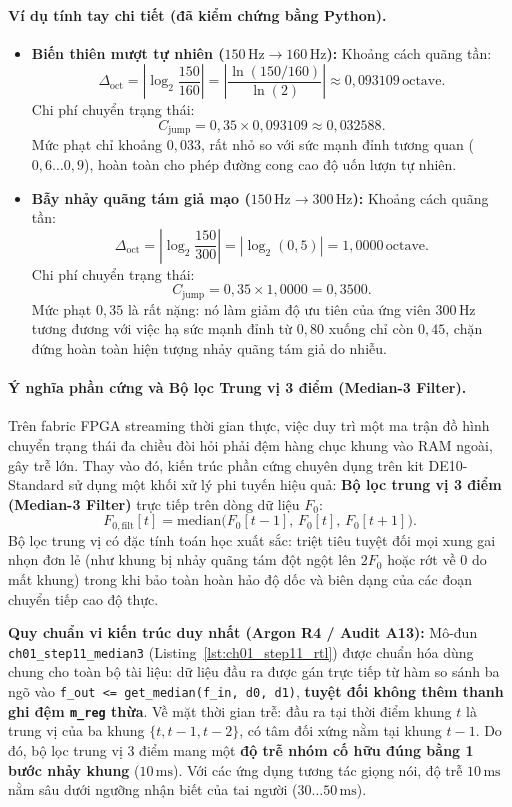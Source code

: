 \paragraph{Ví dụ tính tay chi tiết (đã kiểm chứng bằng Python).}
\begin{itemize}[leftmargin=1.4em]
    \item \textbf{Biến thiên mượt tự nhiên ($150\,\text{Hz} \to 160\,\text{Hz}$):}
    Khoảng cách quãng tần:
    \[
    \Delta_{\mathrm{oct}} = \left| \log_2 \frac{150}{160} \right| = \left| \frac{\ln(150/160)}{\ln(2)} \right| \approx 0{,}093109\,\text{octave}.
    \]
    Chi phí chuyển trạng thái:
    \[
    C_{\mathrm{jump}} = 0{,}35 \times 0{,}093109 \approx 0{,}032588.
    \]
    Mức phạt chỉ khoảng $0{,}033$, rất nhỏ so với sức mạnh đỉnh tương quan ($0{,}6 \ldots 0{,}9$), hoàn toàn cho phép đường cong cao độ uốn lượn tự nhiên.
    \item \textbf{Bẫy nhảy quãng tám giả mạo ($150\,\text{Hz} \to 300\,\text{Hz}$):}
    Khoảng cách quãng tần:
    \[
    \Delta_{\mathrm{oct}} = \left| \log_2 \frac{150}{300} \right| = |\log_2(0{,}5)| = 1{,}0000\,\text{octave}.
    \]
    Chi phí chuyển trạng thái:
    \[
    C_{\mathrm{jump}} = 0{,}35 \times 1{,}0000 = 0{,}3500.
    \]
    Mức phạt $0{,}35$ là rất nặng: nó làm giảm độ ưu tiên của ứng viên $300\,\text{Hz}$ tương đương với việc hạ sức mạnh đỉnh từ $0{,}80$ xuống chỉ còn $0{,}45$, chặn đứng hoàn toàn hiện tượng nhảy quãng tám giả do nhiễu.
\end{itemize}

\paragraph{Ý nghĩa phần cứng và Bộ lọc Trung vị 3 điểm (Median-3 Filter).}
Trên fabric FPGA streaming thời gian thực, việc duy trì một ma trận đồ hình chuyển trạng thái đa chiều đòi hỏi phải đệm hàng chục khung vào RAM ngoài, gây trễ lớn. Thay vào đó, kiến trúc phần cứng chuyên dụng trên kit DE10-Standard sử dụng một khối xử lý phi tuyến hiệu quả: \textbf{Bộ lọc trung vị 3 điểm (Median-3 Filter)} trực tiếp trên dòng dữ liệu $F_0$:
\[
F_{0,\mathrm{filt}}[t] = \mathrm{median}\bigl(F_0[t-1],\, F_0[t],\, F_0[t+1]\bigr).
\]
Bộ lọc trung vị có đặc tính toán học xuất sắc: triệt tiêu tuyệt đối mọi xung gai nhọn đơn lẻ (như khung bị nhảy quãng tám đột ngột lên $2F_0$ hoặc rớt về $0$ do mất khung) trong khi bảo toàn hoàn hảo độ dốc và biên dạng của các đoạn chuyển tiếp cao độ thực.

\textbf{Quy chuẩn vi kiến trúc duy nhất (Argon R4 / Audit A13):}
Mô-đun \texttt{ch01\_step11\_median3} (Listing~\ref{lst:ch01_step11_rtl}) được chuẩn hóa dùng chung cho toàn bộ tài liệu: dữ liệu đầu ra được gán trực tiếp từ hàm so sánh ba ngõ vào \texttt{f\_out <= get\_median(f\_in, d0, d1)}, \textbf{tuyệt đối không thêm thanh ghi đệm \texttt{m\_reg} thừa}. Về mặt thời gian trễ: đầu ra tại thời điểm khung $t$ là trung vị của ba khung $\{t, t-1, t-2\}$, có tâm đối xứng nằm tại khung $t-1$. Do đó, bộ lọc trung vị 3 điểm mang một \textbf{độ trễ nhóm cố hữu đúng bằng 1 bước nhảy khung} ($10\,\text{ms}$). Với các ứng dụng tương tác giọng nói, độ trễ $10\,\text{ms}$ nằm sâu dưới ngưỡng nhận biết của tai người ($30 \ldots 50\,\text{ms}$).

